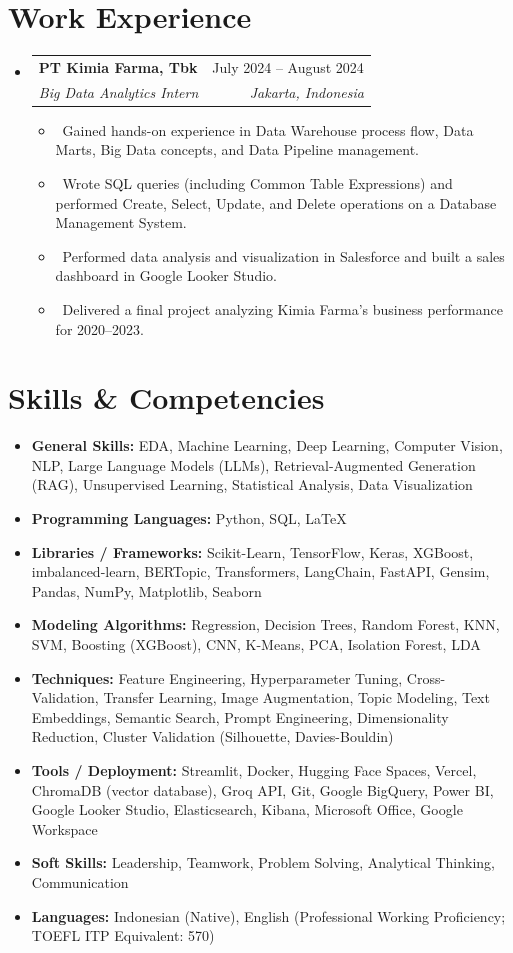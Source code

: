 \documentclass[letterpaper,10pt]{article}
\makeatletter
\newcommand{\resumeItem}[1]{\item\small{#1}}
\newcommand{\resumeSubheading}[4]{
\vspace{-1pt}\item
  \begin{tabular*}{0.97\textwidth}[t]{l@{\extracolsep{\fill}}r}
    \textbf{#1} & #2 \\
    \textit{#3} & \textit{#4} \\
  \end{tabular*}\vspace{-7pt}
}
\newcommand{\resumeSubHeadingList}{\begin{itemize}[leftmargin=0.15in, label={}]}
\newcommand{\resumeSubHeadingListEnd}{\end{itemize}}
\makeatother
\begin{document}
\section{Work Experience}
\resumeSubHeadingList
  \resumeSubheading
      {PT Kimia Farma, Tbk}{July 2024 -- August 2024}
      {Big Data Analytics Intern}{Jakarta, Indonesia}
      \resumeSubHeadingList
          \resumeItem{\textbullet\ Gained hands-on experience in Data Warehouse process flow, Data Marts, Big Data concepts, and Data Pipeline management.}
          \resumeItem{\textbullet\ Wrote SQL queries (including Common Table Expressions) and performed Create, Select, Update, and Delete operations on a Database Management System.}
          \resumeItem{\textbullet\ Performed data analysis and visualization in Salesforce and built a sales dashboard in Google Looker Studio.}
          \resumeItem{\textbullet\ Delivered a final project analyzing Kimia Farma's business performance for 2020--2023.}
      \resumeSubHeadingListEnd
\resumeSubHeadingListEnd

\section{Skills \& Competencies}
\resumeSubHeadingList
  \resumeItem{\textbf{General Skills:} EDA, Machine Learning, Deep Learning, Computer Vision, NLP, Large Language Models (LLMs), Retrieval-Augmented Generation (RAG), Unsupervised Learning, Statistical Analysis, Data Visualization}
  \resumeItem{\textbf{Programming Languages:} Python, SQL, LaTeX}
  \resumeItem{\textbf{Libraries / Frameworks:} Scikit-Learn, TensorFlow, Keras, XGBoost, imbalanced-learn, BERTopic, Transformers, LangChain, FastAPI, Gensim, Pandas, NumPy, Matplotlib, Seaborn}
  \resumeItem{\textbf{Modeling Algorithms:} Regression, Decision Trees, Random Forest, KNN, SVM, Boosting (XGBoost), CNN, K-Means, PCA, Isolation Forest, LDA}
  \resumeItem{\textbf{Techniques:} Feature Engineering, Hyperparameter Tuning, Cross-Validation, Transfer Learning, Image Augmentation, Topic Modeling, Text Embeddings, Semantic Search, Prompt Engineering, Dimensionality Reduction, Cluster Validation (Silhouette, Davies-Bouldin)}
  \resumeItem{\textbf{Tools / Deployment:} Streamlit, Docker, Hugging Face Spaces, Vercel, ChromaDB (vector database), Groq API, Git, Google BigQuery, Power BI, Google Looker Studio, Elasticsearch, Kibana, Microsoft Office, Google Workspace}
  \resumeItem{\textbf{Soft Skills:} Leadership, Teamwork, Problem Solving, Analytical Thinking, Communication}
  \resumeItem{\textbf{Languages:} Indonesian (Native), English (Professional Working Proficiency; TOEFL ITP Equivalent: 570)}
\resumeSubHeadingListEnd
\end{document}
